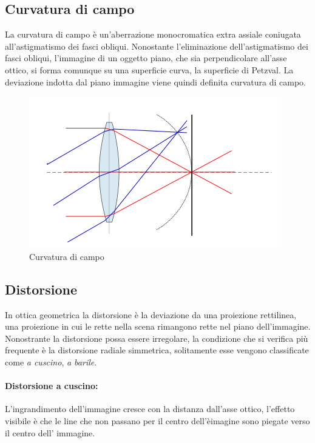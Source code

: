 \subsection{Curvatura di campo}
La curvatura di campo è un'aberrazione
monocromatica extra assiale coniugata all'astigmatismo dei fasci obliqui.
Nonostante l'eliminazione dell'astigmatismo dei fasci obliqui, l'immagine di
un oggetto piano, che sia perpendicolare all'asse ottico, si forma comunque su
una superficie curva, la superficie di Petzval. La deviazione indotta dal
piano immagine viene quindi definita curvatura di campo.

\begin{figure}

\centering
\includegraphics[width=.5\textwidth]{img/curvatura-campo.png}

\caption{Curvatura di campo}
\label{fig:curvatura-campo}
\end{figure}

\subsection{Distorsione}
In ottica geometrica la distorsione è la deviazione da una proiezione rettilinea, una proiezione in cui le rette nella scena rimangono rette nel piano dell'immagine.
Nonostrante la distorsione possa essere irregolare, la condizione che si verifica più frequente è la distorsione radiale simmetrica, solitamente esse vengono classificate come \emph{a cuscino}, \emph{a barile}.

\paragraph{Distorsione a cuscino:}
L'ingrandimento dell'immagine cresce con la distanza dall'asse ottico, l'effetto visibile è che le line che non passano per il centro dell'èimagine sono piegate verso il centro dell' immagine.
